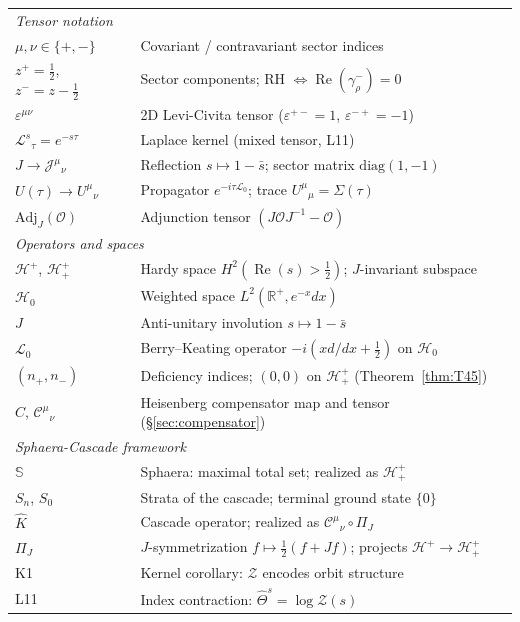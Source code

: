 \documentclass[12pt,a4paper]{article}
\theoremstyle{remark}
\begin{document}
\begin{longtable}{p{3.2cm}p{11cm}}
%
\multicolumn{2}{l}{\textit{Tensor notation}}\\[2pt]
$\mu,\nu\in\{+,-\}$ & Covariant / contravariant sector indices\\
$z^+=\tfrac{1}{2}$, $z^-=z-\tfrac{1}{2}$ & Sector components; RH $\Leftrightarrow\operatorname{Re}(\gamma_\rho^-)=0$\\
$\varepsilon^{\mu\nu}$ & 2D Levi-Civita tensor ($\varepsilon^{+-}=1$, $\varepsilon^{-+}=-1$)\\
$\mathcal{L}^s{}_\tau=e^{-s\tau}$ & Laplace kernel (mixed tensor, L11)\\
$J\to\mathcal{J}^{\mu}{}_\nu$ & Reflection $s\mapsto1-\bar{s}$; sector matrix $\mathrm{diag}(1,-1)$\\
$U(\tau)\to U^\mu{}_\nu$ & Propagator $e^{-i\tau\mathcal{L}_0}$; trace $U^\mu{}_\mu=\Sigma(\tau)$\\
$\mathrm{Adj}_J(\mathcal{O})$ & Adjunction tensor $(J\mathcal{O}J^{-1}-\mathcal{O})$\\[4pt]
%
\multicolumn{2}{l}{\textit{Operators and spaces}}\\[2pt]
$\mathcal{H}^+$, $\mathcal{H}^+_+$ & Hardy space $H^2(\operatorname{Re}(s)>\tfrac{1}{2})$; $J$-invariant subspace\\
$\mathcal{H}_0$ & Weighted space $L^2(\mathbb{R}^+,e^{-x}dx)$\\
$J$ & Anti-unitary involution $s\mapsto1-\bar{s}$\\
$\mathcal{L}_0$ & Berry--Keating operator $-i(xd/dx+\tfrac{1}{2})$ on $\mathcal{H}_0$\\
$(n_+,n_-)$ & Deficiency indices; $(0,0)$ on $\mathcal{H}^+_+$ (Theorem~\ref{thm:T45})\\
$C$, $\mathcal{C}^{\mu}{}_\nu$ & Heisenberg compensator map and tensor (\S\ref{sec:compensator})\\[4pt]
%
\multicolumn{2}{l}{\textit{Sphaera-Cascade framework}}\\[2pt]
$\mathbb{S}$ & Sphaera: maximal total set; realized as $\mathcal{H}^+_+$\\
$S_n$, $S_0$ & Strata of the cascade; terminal ground state $\{0\}$\\
$\hat{K}$ & Cascade operator; realized as $\mathcal{C}^\mu{}_\nu\circ\Pi_J$\\
$\Pi_J$ & $J$-symmetrization $f\mapsto\tfrac{1}{2}(f+Jf)$; projects $\mathcal{H}^+\to\mathcal{H}^+_+$\\
K1 & Kernel corollary: $\mathcal{Z}$ encodes orbit structure\\
L11 & Index contraction: $\hat\Theta^s=\log\mathcal{Z}(s)$\\

\end{longtable}
\end{document}
